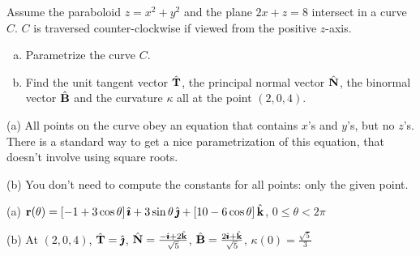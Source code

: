 \begin{question}[M317 2009A] %
Assume the paraboloid $z = x^2 + y^2$ and the plane $2x + z = 8$ 
intersect in a curve $C$. $C$ is traversed counter-clockwise 
if viewed from the positive $z$-axis.
\begin{enumerate}[(a)]
\item
Parametrize the curve $C$.
\item
Find the unit tangent vector $\hat{\mathbf{T}}$, the principal normal vector 
$\hat{\mathbf{N}}$, the binormal vector $\hat{\mathbf{B}}$ and the curvature $\kappa$ 
all at the point $(2, 0, 4)$.
\end{enumerate}
\end{question}

\begin{hint} 
(a) All points on the curve obey an equation that contains $x$'s and $y$'s,
but no $z$'s. There is a standard way to get a nice parametrization of this equation, that doesn't involve using square roots.

(b) You don't need to compute the constants for all points: only the given point.
\end{hint}

\begin{answer} 
(a) $\mathbf{r}(\theta) = [-1 + 3\cos\theta]\,\hat{\pmb{\imath}}
                   +3\sin\theta\,\hat{\pmb{\jmath}}
                   +[10-6\cos\theta]\,\hat{\mathbf{k}}$, 
$0\le\theta < 2\pi$

(b) At $(2,0,4)$, $\hat{\mathbf{T}} = \hat{\pmb{\jmath}}$, 
                  $\hat{\mathbf{N}} = \frac{-\hat{\pmb{\imath}}+2\hat{\mathbf{k}}}{\sqrt{5}}$,
                  $\hat{\mathbf{B}} = \frac{2\hat{\pmb{\imath}}+\hat{\mathbf{k}}}{\sqrt{5}}$,
                  $\kappa(0) =\frac{\sqrt{5}}{3}$
\end{answer}

